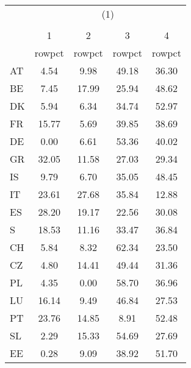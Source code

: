 {
\def\sym#1{\ifmmode^{#1}\else\(^{#1}\)\fi}
\begin{tabular}{l*{4}{c}}
\hline\hline
            &\multicolumn{4}{c}{(1)}                            \\
            &\multicolumn{4}{c}{}                               \\
            &           1&           2&           3&           4\\
            &      rowpct&      rowpct&      rowpct&      rowpct\\
\hline
AT          &        4.54&        9.98&       49.18&       36.30\\
BE          &        7.45&       17.99&       25.94&       48.62\\
DK          &        5.94&        6.34&       34.74&       52.97\\
FR          &       15.77&        5.69&       39.85&       38.69\\
DE          &        0.00&        6.61&       53.36&       40.02\\
GR          &       32.05&       11.58&       27.03&       29.34\\
IS          &        9.79&        6.70&       35.05&       48.45\\
IT          &       23.61&       27.68&       35.84&       12.88\\
ES          &       28.20&       19.17&       22.56&       30.08\\
S           &       18.53&       11.16&       33.47&       36.84\\
CH          &        5.84&        8.32&       62.34&       23.50\\
CZ          &        4.80&       14.41&       49.44&       31.36\\
PL          &        4.35&        0.00&       58.70&       36.96\\
LU          &       16.14&        9.49&       46.84&       27.53\\
PT          &       23.76&       14.85&        8.91&       52.48\\
SL          &        2.29&       15.33&       54.69&       27.69\\
EE          &        0.28&        9.09&       38.92&       51.70\\
\hline\hline
\end{tabular}
}
